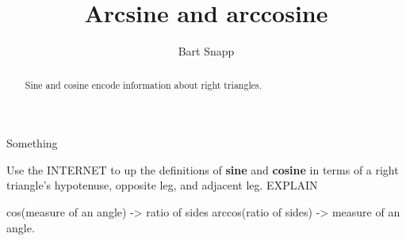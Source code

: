 \documentclass[noauthor,nooutcomes,12pt]{ximera}
\title{Arcsine and arccosine}
\author{Bart Snapp}
\begin{document}
\begin{abstract}
  Sine and cosine encode information about right triangles.
\end{abstract}
\maketitle

\begin{listOutcomes}
\item Something
\end{listOutcomes}
\mynewpage




\begin{question}
  Use the INTERNET to up the definitions of \textbf{sine} and
  \textbf{cosine} in terms of a right triangle's hypotenuse, opposite
  leg, and adjacent leg. EXPLAIN
  
  
\end{question}
\mynewpage

cos(measure of an angle) -> ratio of sides
arccos(ratio of sides) -> measure of an angle.
\end{document}
